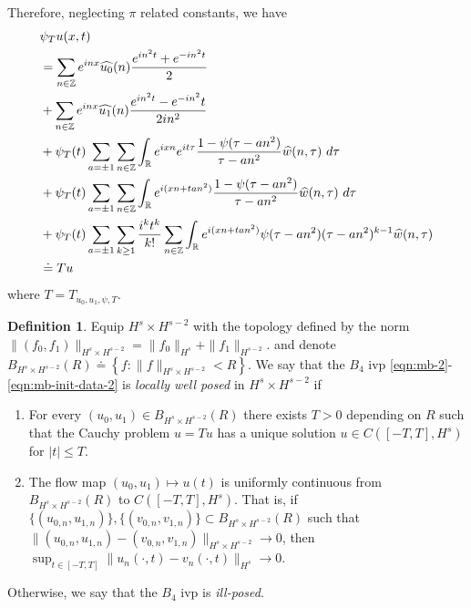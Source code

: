 \documentclass[12pt,reqno]{amsart}
\numberwithin{equation}{section}  %
\numberwithin{figure}{section}
\newcommand{\rr}{\mathbb{R}}
\newcommand{\zz}{\mathbb{Z}}
\newcommand{\wh}{\widehat}
\theoremstyle{plain}
\theoremstyle{definition}
\newtheorem{definition}{Definition}
\theoremstyle{remark}
\begin{document}
%
%
Therefore, neglecting $\pi$ related constants, we have
%
%
\begin{align}
  & \psi_{T} u(x,t)
  \notag
  \\
  \label{main-rel-term-1}
  & = \sum_{n \in \zz} e^{inx} \wh{u_{0}}(n) \frac{e^{in^{2}t} + e^{-in^{2}t}}{2} 
  \\
  \label{main-rel-term-2}
  & + \sum_{n \in \zz} e^{inx}
  \wh{u_{1}}(n)\frac{e^{in^{2}t} - e^{-in^{2}}t}{2 i n^{2}} 
  \\
  \label{main-rel-term-3}
  & + \psi_{T}(t) \sum_{a = \pm 1} \sum_{n\in \zz} \int_\rr e^{ixn}  
  e^{it \tau} \frac{ 1 - \psi(\tau -  an^{2}) 
  }{\tau -  an^{2}} \wh{w}(n, \tau) \ d \tau
  \\
  \label{main-rel-term-4}
  & + \psi_{T}(t) \sum_{a = \pm 1} \sum_{n\in \zz} \int_\rr e^{i(xn + 
  t an^{2})}
  \frac{1- \psi(\tau -  an^{2})}{\tau -  an^{2}} \wh{w}(n, \tau) \ d \tau
  \\
  & + \psi_{T}(t) \sum_{a = \pm 1}  \sum_{k \ge 1} \frac{i^k t^k}{k!}
  \sum_{n \in \zz} \int_\rr e^{i(xn + t an^{2} )}
  \psi(\tau -  an^{2}) (\tau -  an^{2})^{k-1} \wh{w}(n, \tau)
  \\
  \label{main-rel-term-5}
  & \doteq Tu
\end{align}
%
%
where $T=T_{u_0, u_1, \psi, T}$.
\begin{definition}
  Equip $H^{s} \times H^{s-2}$ with the 
  topology defined by the norm $\|(f_0, f_1)\|_{H^{s} \times H^{s-2}}
  = \|f_0\|_{H^{s}} + \|f_1\|_{H^{s-2}}$.
  and denote $B_{H^{s} \times H^{s-2}}(R) \doteq \left\{ f: \| f \|_{H^{s} \times
  H^{s-2}} < R
  \right\}$. We say that the $B_{4}$ ivp
  \eqref{eqn:mb-2}-\eqref{eqn:mb-init-data-2} is
	\emph{locally well posed} in
  $H^s \times H^{s-2}$ if 
	\begin{enumerate}
    \item For every $(u_{0}, u_{1}) \in B_{H^{s} \times H^{s-2}}(R)$
      there exists $T>0$ depending on $R$ such that the Cauchy problem
       $u = Tu$ has a unique solution $u \in C([-T,
      T], H^s)$ for $ |t| \le T$.
    \item
      The flow map $(u_0, u_{1}) \mapsto u(t)$ is uniformly continuous from
      $B_{H^{s} \times H^{s-2}}(R)$ 
      to $C(\left[ -T, T \right], H^s)$. That is, if
      $\{(u_{0,n}, u_{1,n} ) \}, \{(v_{0,n}, v_{1,n} )\}
      \subset B_{H^{s} \times H^{s-2}}(R)$ such that $\|(u_{0,n}, u_{1,n}) -
      (v_{0,n}, v_{1,n}) \|_{H^{s} \times H^{s-2}} \to 0$, then 
      $\sup_{t \in [-T, T]}
      \|u_{n}(\cdot, t) - v_{n}(\cdot, t) \|_{H^s} \to 0$.
  \end{enumerate}
	Otherwise, we say that the $B_{4}$ ivp is \emph{ill-posed}.
\end{definition}
\end{document}
